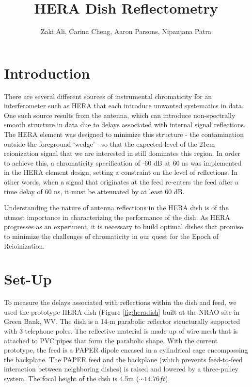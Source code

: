 \documentclass[12pt,preprint]{aastex}
\begin{document}
\title{HERA Dish Reflectometry} 
\author{Zaki Ali, Carina Cheng, Aaron Parsons, Nipanjana Patra}
\maketitle

\section{Introduction}

There are several different sources of instrumental chromaticity for an interferometer such as HERA that each introduce unwanted systematics in data. One such source results from the antenna, which can introduce non-spectrally smooth structure in data due to delays associated with internal signal reflections. The HERA element was designed to minimize this structure - the contamination outside the foreground `wedge' - so that the expected level of the 21cm reionization signal that we are interested in still dominates this region. In order to achieve this, a chromaticity specification of -60 dB at 60 ns was implemented in the HERA element design, setting a constraint on the level of reflections. In other words, when a signal that originates at the feed re-enters the feed after a time delay of 60 ns, it must be attenuated by at least 60 dB. 

Understanding the nature of antenna reflections in the HERA dish is of the utmost importance in characterizing the performance of the dish. As HERA progresses as an experiment, it is necessary to build optimal dishes that promise to minimize the challenges of chromaticity in our quest for the Epoch of Reioinization.

\section{Set-Up}

To measure the delays associated with reflections within the dish and feed, we
used the prototype HERA dish (Figure \ref{fig:heradish} built at the NRAO site in
Green Bank, WV. The dish is a 14-m parabolic reflector structurally supported
with 3 telephone poles. The reflective material is made up of wire mesh that
is attached to PVC pipes that form the parabolic shape. With the current
prototype, the feed is a PAPER dipole encased in a cylindrical cage encompassing
the backplane. The PAPER feed and the backplane (which prevents feed-to-feed
interaction between neighboring dishes) is raised and lowered by a three-pulley
system. The focal height of the dish is 4.5m ($\sim{14.76ft}$).
\end{document}
